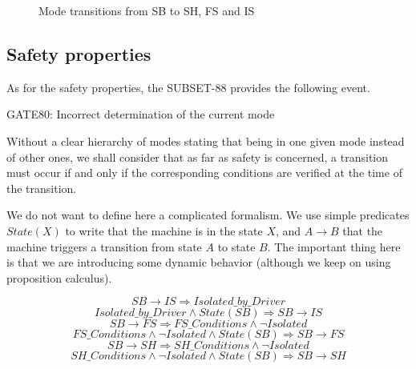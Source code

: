\documentclass{template/openetcs_article}
\def\implies{\Rightarrow}
\begin{document}
\begin{figure}
  \centering
  \caption{Mode transitions from SB to SH, FS and IS}
  \label{fig:trans_sb}
\end{figure}

\subsection{Safety properties}
As for the safety properties, the SUBSET-88 provides the following event. 
\begin{center}
GATE80: Incorrect determination of the current mode
\end{center}
Without a clear hierarchy of modes stating that being in one given mode instead of other ones, we 
shall consider that as far as safety is concerned, a transition must occur if and only if the 
corresponding conditions are verified at the time of the transition.

We do not want to define here a complicated formalism. We use simple predicates
$State(X)$ to write that the machine is in the state $X$, and $A\rightarrow B$ that the machine triggers
a transition from state $A$ to state $B$. The important thing here is that we are introducing some 
dynamic behavior (although we keep on using proposition calculus).


$$SB\rightarrow IS \implies Isolated\_by\_Driver$$
$$Isolated\_by\_Driver \wedge State(SB) \implies SB\rightarrow IS$$
$$SB\rightarrow FS \implies FS\_Conditions \wedge \neg Isolated$$
$$FS\_Conditions \wedge \neg Isolated \wedge State(SB) \implies SB\rightarrow FS$$
$$SB\rightarrow SH \implies SH\_Conditions \wedge \neg Isolated$$
$$SH\_Conditions \wedge \neg Isolated \wedge State(SB) \implies SB\rightarrow SH $$
\end{document}
